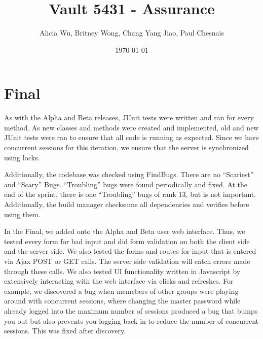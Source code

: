 \documentclass{article}
\title{Vault 5431 - Assurance}
\author{Alicia Wu, Britney Wong, Chang Yang Jiao, Paul Chesnais}
\date{\today}
\begin{document}
\maketitle
\thispagestyle{empty}
\section{Final}
\par As with the Alpha and Beta releases, JUnit tests were written and ran for every method. As new classes and methods were created and implemented, old and new JUnit tests were ran to ensure that all code is running as expected. Since we have concurrent sessions for this iteration, we ensure that the server is synchronized using locks.

\par Additionally, the codebase was checked using FindBugs. There are no ``Scariest'' and ``Scary'' Bugs. ``Troubling'' bugs were found periodically and fixed. At the end of the sprint, there is one ``Troubling'' bugs of rank 13, but is not important. Additionally, the build manager checksums all dependencies and verifies before using them.

\par In the Final, we added onto the Alpha and Beta user web interface. Thus, we tested every form for bad input and did form validation on both the client side and the server side. We also tested the forms and routes for input that is entered via Ajax POST or GET calls. The server side validation will catch errors made through these calls. We also tested UI functionality written in Javascript by extensively interacting with the web interface via clicks and refreshes. For example, we discovered a bug when memebers of other groups were playing around with concurrent sessions, where changing the master password while already logged into the maximum number of sessions produced a bug that bumps you out but also prevents you logging back in to reduce the number of concurrent sessions. This was fixed after discovery.
\end{document}
